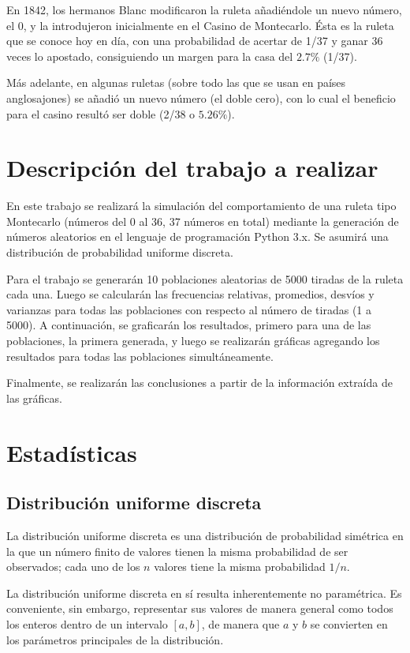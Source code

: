 \documentclass{article}
\begin{document}
En 1842, los hermanos Blanc modificaron la ruleta añadiéndole un nuevo número, el 0, y la introdujeron inicialmente en el Casino de Montecarlo. Ésta es la ruleta que se conoce hoy en día, con una probabilidad de acertar de 1/37 y ganar 36 veces lo apostado, consiguiendo un margen para la casa del $2.7\%$ (1/37).

Más adelante, en algunas ruletas (sobre todo las que se usan en países anglosajones) se añadió un nuevo número (el doble cero), con lo cual el beneficio para el casino resultó ser doble (2/38 o $5.26\%$).

\section{Descripción del trabajo a realizar}
En este trabajo se realizará la simulación del comportamiento de una ruleta tipo Montecarlo (números del 0 al 36, 37 números en total) mediante la generación de números aleatorios en el lenguaje de programación Python 3.x. Se asumirá una distribución de probabilidad uniforme discreta.

Para el trabajo se generarán 10 poblaciones aleatorias de 5000 tiradas de la ruleta cada una. Luego se calcularán las frecuencias relativas, promedios, desvíos y varianzas para todas las poblaciones con respecto al número de tiradas (1 a 5000). A continuación, se graficarán los resultados, primero para una de las poblaciones, la primera generada, y luego se realizarán gráficas agregando los resultados para todas las poblaciones simultáneamente.

Finalmente, se realizarán las conclusiones a partir de la información extraída de las gráficas.

\section{Estadísticas}
\subsection{Distribución uniforme discreta \cite{wiki-uniforme-discreta}}
La distribución uniforme discreta es una distribución de probabilidad simétrica en la que un número finito de valores tienen la misma probabilidad de ser observados; cada uno de los $n$ valores tiene la misma probabilidad $1/n$.

La distribución uniforme discreta en sí resulta inherentemente no paramétrica. Es conveniente, sin embargo, representar sus valores de manera general como todos los enteros dentro de un intervalo $[a,b]$, de manera que $a$ y $b$ se convierten en los parámetros principales de la distribución.
\end{document}
